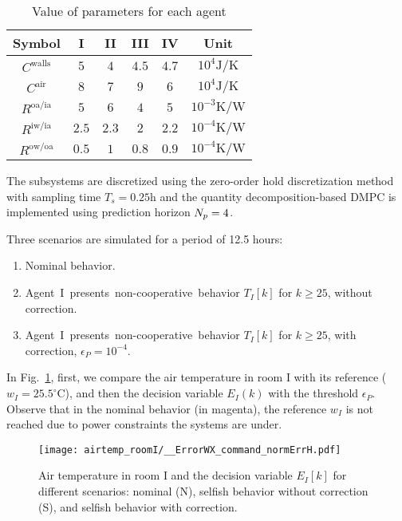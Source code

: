 \documentclass{ifacconf}  %
\begin{document}
  \begin{table}[b]
  \centering
  \caption{
    Value of parameters for each agent}\label{tab:modelParam}
  \begin{tabular}[t]{cccccc} \toprule
    Symbol& I & II & III & IV &Unit\\
    \midrule
    $C^{\text{walls}}$    &$5$   & $4$ & $4.5$ &$4.7$ &$10^{4}\mathrm{J/K}$ \\
    $C^{\text{air}}$               &$8$   & $7$ &$9$&$6$  &$10^{4}\mathrm{J/K}$  \\
    $R^{\text{oa/ia}}$               &$5$   & $6$& $4$& $5$  &$10^{-3}\mathrm{K/W}$ \\
    $R^{\text{iw/ia}}$               &$2.5$ & $2.3$&$2$&$2.2$ &$10^{-4}\mathrm{K/W}$\\
    $R^{\text{ow/oa}}$               &$0.5$ & $1$ &$0.8$&$0.9$  & $10^{-4}\mathrm{K/W}$ \\
    \bottomrule
  \end{tabular}
\end{table}

The subsystems are discretized using the zero-order hold discretization method with sampling time
${T_{s}=0.25\mathrm{h}}$
and the quantity decomposition-based DMPC is implemented using prediction horizon ${N_{p}=4}$.

Three scenarios are simulated for a period of 12.5 hours:

  \begin{enumerate}
    \item Nominal behavior.
    \item \mbox{Agent I presents non-cooperative behavior} ${T_{I}[k]}$ for ${k\geq25}$, without correction.
    \item \mbox{Agent I presents non-cooperative behavior} ${T_{I}[k]}$ for ${k\geq25}$, with correction, ${\epsilon_{P}=10^{-4}}$.
  \end{enumerate}

In Fig.~\ref{fig:response3Scenarios}, first, we compare the air temperature in room I
with its reference (${w_{I}=25.5^{\circ}}$C), and then the
decision variable ${E_{I}(k)}$ with the threshold $\epsilon_{P}$.
Observe that in the nominal behavior (in magenta), the reference $w_{I}$ is not reached
due to power constraints the systems are under.

\begin{figure}[h]
  \centering
 \texttt{[image: airtemp\_roomI/\_\_ErrorWX\_command\_normErrH.pdf]}
  \caption{Air temperature in room I and the decision variable $E_{I}[k]$ for different scenarios: nominal (N), selfish behavior without correction (S),
and selfish behavior with correction.}\label{fig:response3Scenarios}
\end{figure}
\end{document}
